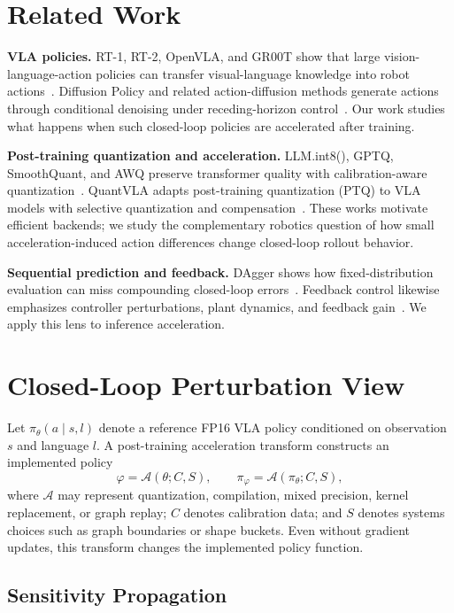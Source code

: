 \documentclass[letterpaper,10pt,twocolumn]{article}
\begin{document}
\section{Related Work}

\textbf{VLA policies.}
RT-1, RT-2, OpenVLA, and GR00T show that large vision-language-action policies can transfer visual-language knowledge into robot actions~\citep{rt1,rt2,openvla,grootn1}. Diffusion Policy and related action-diffusion methods generate actions through conditional denoising under receding-horizon control~\citep{diffusionpolicy}. Our work studies what happens when such closed-loop policies are accelerated after training.

\textbf{Post-training quantization and acceleration.}
LLM.int8(), GPTQ, SmoothQuant, and AWQ preserve transformer quality with calibration-aware quantization~\citep{llmint8,gptq,smoothquant,awq}. QuantVLA adapts post-training quantization (PTQ) to VLA models with selective quantization and compensation~\citep{quantvla}. These works motivate efficient backends; we study the complementary robotics question of how small acceleration-induced action differences change closed-loop rollout behavior.

\textbf{Sequential prediction and feedback.}
DAgger shows how fixed-distribution evaluation can miss compounding closed-loop errors~\citep{dagger}. Feedback control likewise emphasizes controller perturbations, plant dynamics, and feedback gain~\citep{astrom2008feedback}. We apply this lens to inference acceleration.

\section{Closed-Loop Perturbation View}

Let $\pi_\theta(a\mid s,l)$ denote a reference FP16 VLA policy conditioned on observation $s$ and language $l$. A post-training acceleration transform constructs an implemented policy
\begin{equation}
    \varphi = \mathcal{A}(\theta; C,S), \qquad \pi_\varphi=\mathcal{A}(\pi_\theta; C,S),
\end{equation}
where $\mathcal{A}$ may represent quantization, compilation, mixed precision, kernel replacement, or graph replay; $C$ denotes calibration data; and $S$ denotes systems choices such as graph boundaries or shape buckets. Even without gradient updates, this transform changes the implemented policy function.

\subsection{Sensitivity Propagation}
\end{document}
